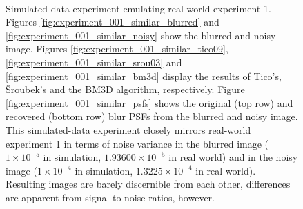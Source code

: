 \documentclass[12pt,notitlepage]{report}
\begin{document}
\begin{figure}[h]
	  ~
	  ~
  \caption[Simulated data experiment similar emulating real-world experiment 1]{Simulated data experiment emulating real-world experiment 1. Figures \ref{fig:experiment_001_similar_blurred} and \ref{fig:experiment_001_similar_noisy} show the blurred and noisy image. Figures \ref{fig:experiment_001_similar_tico09}, \ref{fig:experiment_001_similar_srou03} and \ref{fig:experiment_001_similar_bm3d} display the results of Tico's, Šroubek's and the BM3D algorithm, respectively. Figure \ref{fig:experiment_001_similar_psfs} shows the original (top row) and recovered (bottom row) blur PSFs from the blurred and noisy image. This simulated-data experiment closely mirrors real-world experiment 1 in terms of noise variance in the blurred image ($1 \times 10^{-5}$ in simulation, $1.93600 \times 10^{-5}$ in real world) and in the noisy image ($1 \times 10^{-4}$ in simulation, $1.3225 \times 10^{-4}$ in real world). Resulting images are barely discernible from each other, differences are apparent from signal-to-noise ratios, however.}
  \label{fig:experiment_001_similar}
\end{figure}
\end{document}
